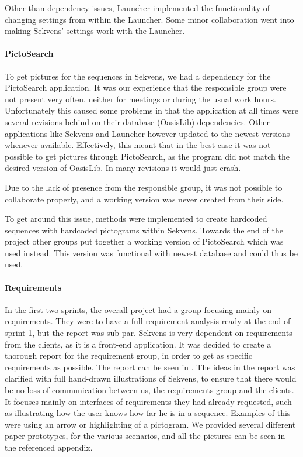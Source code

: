 Other than dependency issues, Launcher implemented the functionality of changing settings from within the Launcher. Some minor collaboration went into making Sekvens' settings work with the Launcher.

\paragraph{PictoSearch}
To get pictures for the sequences in Sekvens, we had a dependency for the PictoSearch application. It was our experience that the responsible group were not present very often, neither for meetings or during the usual work hours. Unfortunately this caused some problems in that the application at all times were several revisions behind on their database (OasisLib) dependencies. Other applications like Sekvens and Launcher however updated to the newest versions whenever available. Effectively, this meant that in the best case it was not possible to get pictures through PictoSearch, as the program did not match the desired version of OasisLib. In many revisions it would just crash.

Due to the lack of presence from the responsible group, it was not possible to collaborate properly, and a working version was never created from their side.

To get around this issue, methods were implemented to create hardcoded sequences with hardcoded pictograms within Sekvens. Towards the end of the project other groups put together a working version of PictoSearch which was used instead. This version was functional with newest database and could thus be used.

\paragraph{Requirements}
In the first two sprints, the overall project had a group focusing mainly on requirements. They were to have a full requirement analysis ready at the end of sprint 1, but the report was sub-par. Sekvens is very dependent on requirements from the clients, as it is a front-end application. It was decided to create a thorough report for the requirement group, in order to get as specific requirements as possible. The report can be seen in . The ideas in the report was clarified with full hand-drawn illustrations of Sekvens, to ensure that there would be no loss of communication between us, the requirements group and the clients. It focuses mainly on interfaces of requirements they had already requested, such as illustrating how the user knows how far he is in a sequence. Examples of this were using an arrow or highlighting of a pictogram. We provided several different paper prototypes, for the various scenarios, and all the pictures can be seen in the referenced appendix.